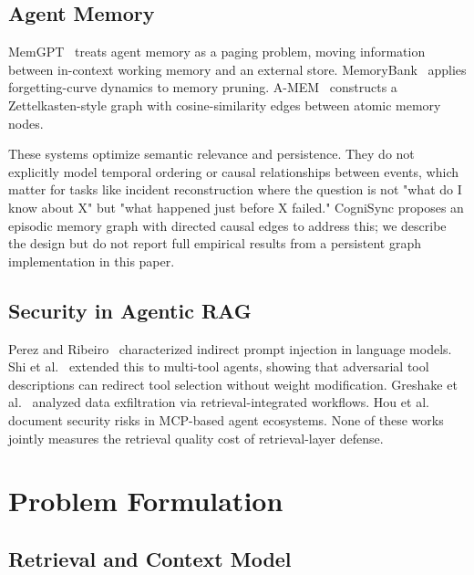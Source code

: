\documentclass[sigconf]{acmart}
\begin{document}
\subsection{Agent Memory}

MemGPT~\cite{packer2023memgpt} treats agent memory as a paging problem, moving
information between in-context working memory and an external store.
MemoryBank~\cite{zhong2023memorybank} applies forgetting-curve dynamics to
memory pruning. A-MEM~\cite{xu2025amem} constructs a Zettelkasten-style graph
with cosine-similarity edges between atomic memory nodes.

These systems optimize semantic relevance and persistence. They do not
explicitly model temporal ordering or causal relationships between events, which
matter for tasks like incident reconstruction where the question is not
"what do I know about X" but "what happened just before X failed." CogniSync
proposes an episodic memory graph with directed causal edges to address this; we
describe the design but do not report full empirical results from a persistent
graph implementation in this paper.

\subsection{Security in Agentic RAG}

Perez and Ribeiro~\cite{perez2022injection} characterized indirect prompt
injection in language models. Shi et al.~\cite{shi2025toolhijacker} extended
this to multi-tool agents, showing that adversarial tool descriptions can
redirect tool selection without weight modification. Greshake et
al.~\cite{greshake2023indirect} analyzed data exfiltration via
retrieval-integrated workflows. Hou et al.~\cite{hou2025mcp} document security
risks in MCP-based agent ecosystems. None of these works jointly measures the
retrieval quality cost of retrieval-layer defense.

\section{Problem Formulation}

\subsection{Retrieval and Context Model}
\end{document}
